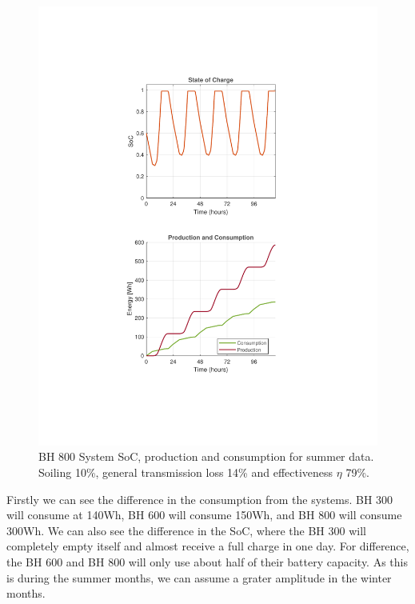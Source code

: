 \begin{minipage}[t]{0.32\textwidth} %
    \begin{figure}[H]
        \centering
        \includegraphics[width=\linewidth]{photos/Summer_SOC&Consumption_with_all_loss_5Days_800System.pdf} %
        \captionsetup{font=footnotesize} %
        \caption{BH 800 System SoC, production and consumption for summer data. Soiling 10\%, general transmission loss 14\% and effectiveness $\eta$ 79\%.}
        \label{result:fig:800_summer_soc}
    \end{figure}
\end{minipage}

Firstly we can see the difference in the consumption from the systems. BH 300 will consume at 140Wh, BH 600 will consume 150Wh, and BH 800 will consume 300Wh. We can also see the difference in the SoC, where the BH 300 will completely empty itself and almost receive a full charge in one day. For difference, the BH 600 and BH 800 will only use about half of their battery capacity. As this is during the summer months, we can assume a grater amplitude in the winter months. 
\newpage
